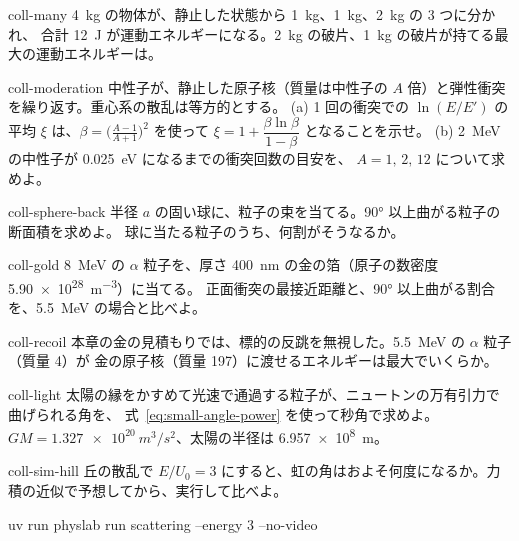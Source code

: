 \begin{exercise}[応用]{coll-many}
\qty{4}{kg} の物体が、静止した状態から \qty{1}{kg}、\qty{1}{kg}、\qty{2}{kg} の 3 つに分かれ、
合計 \qty{12}{J} が運動エネルギーになる。\qty{2}{kg} の破片、\qty{1}{kg} の破片が持てる最大の運動エネルギーは。
\end{exercise}

\begin{exercise}[応用]{coll-moderation}
中性子が、静止した原子核（質量は中性子の $A$ 倍）と弾性衝突を繰り返す。重心系の散乱は等方的とする。
(a) 1 回の衝突での $\ln(E/E')$ の平均 $\xi$ は、$\beta=\bigl(\tfrac{A-1}{A+1}\bigr)^2$ を使って
$\xi=1+\dfrac{\beta\ln\beta}{1-\beta}$ となることを示せ。
(b) \qty{2}{MeV} の中性子が \qty{0.025}{eV} になるまでの衝突回数の目安を、
$A=1,\,2,\,12$ について求めよ。
\end{exercise}

\begin{exercise}[応用]{coll-sphere-back}
半径 $a$ の固い球に、粒子の束を当てる。\ang{90} 以上曲がる粒子の断面積を求めよ。
球に当たる粒子のうち、何割がそうなるか。
\end{exercise}

\begin{exercise}[応用]{coll-gold}
\qty{8}{MeV} の $\alpha$ 粒子を、厚さ \qty{400}{nm} の金の箔（原子の数密度 \qty{5.90e28}{m^{-3}}）に当てる。
正面衝突の最接近距離と、\ang{90} 以上曲がる割合を、\qty{5.5}{MeV} の場合と比べよ。
\end{exercise}

\begin{exercise}[応用]{coll-recoil}
本章の金の見積もりでは、標的の反跳を無視した。\qty{5.5}{MeV} の $\alpha$ 粒子（質量 4）が
金の原子核（質量 197）に渡せるエネルギーは最大でいくらか。
\end{exercise}

\begin{exercise}[応用]{coll-light}
太陽の縁をかすめて光速で通過する粒子が、ニュートンの万有引力で曲げられる角を、
式~\eqref{eq:small-angle-power} を使って秒角で求めよ。
$GM=\qty{1.327e20}{m^3/s^2}$、太陽の半径は \qty{6.957e8}{m}。
\end{exercise}

\begin{exercise}[シミュレーション]{coll-sim-hill}
丘の散乱で $E/U_0=3$ にすると、虹の角はおよそ何度になるか。力積の近似で予想してから、実行して比べよ。
\begin{terminal}
uv run physlab run scattering --energy 3 --no-video
\end{terminal}
\end{exercise}

